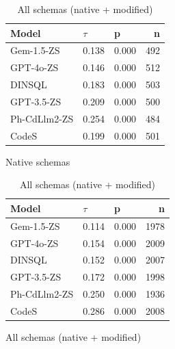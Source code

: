 \begin{table}
  \centering
  \caption{Kendall-Tau ($\tau$) Correlations between \emph{Query Combined Naturalness} and \emph{Query Recall}.}
  \begin{subfigure}{.5\linewidth}
      \centering
      \caption{Native schemas}
      \begin{tabular}{lllr}
\toprule
Model & $\tau$ & p & n \\
\midrule
Gem-1.5-ZS & 0.138 & 0.000 & 492 \\
GPT-4o-ZS & 0.146 & 0.000 & 512 \\
DINSQL & 0.183 & 0.000 & 503 \\
GPT-3.5-ZS & 0.209 & 0.000 & 500 \\
Ph-CdLlm2-ZS & 0.254 & 0.000 & 484 \\
CodeS & 0.199 & 0.000 & 501 \\
\bottomrule
\end{tabular}

      \label{table:recallktaunative}
  \end{subfigure}%
  \begin{subfigure}{.5\linewidth}
      \centering
      \caption{All schemas (native + modified)}
      \begin{tabular}{lllr}
\toprule
Model & $\tau$ & p & n \\
\midrule
Gem-1.5-ZS & 0.114 & 0.000 & 1978 \\
GPT-4o-ZS & 0.154 & 0.000 & 2009 \\
DINSQL & 0.152 & 0.000 & 2007 \\
GPT-3.5-ZS & 0.172 & 0.000 & 1998 \\
Ph-CdLlm2-ZS & 0.250 & 0.000 & 1936 \\
CodeS & 0.286 & 0.000 & 2008 \\
\bottomrule
\end{tabular}

      \label{table:recallktauall}
  \end{subfigure}
\end{table}

